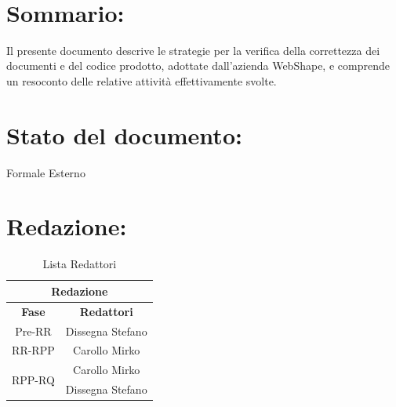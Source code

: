 \newpage
 
\begin{center} %
  \begin{Huge}  
        \textbf{\TITOLODOC}
      \\
  \end{Huge}
\end{center}
 
\section*{\LARGE Sommario:} %
\indent \indent
Il presente documento descrive le strategie per la verifica della correttezza dei documenti e del codice prodotto, adottate dall'azienda WebShape, e comprende un resoconto delle relative attivit\`a effettivamente svolte.
 
\section*{\LARGE Stato del documento:}
\indent \indent
  Formale Esterno
 
\section*{\LARGE Redazione:}
  \begin{table}[!h]
    \begin{center}
      \begin{tabular}
        {|c|c|}
        \hline
        \multicolumn{2}{|c|}{ \textbf{Redazione} } \\
        \hline
        \textbf{Fase} & \textbf{Redattori} \\
        \hline
        Pre-RR & Dissegna Stefano\\
        \hline
        RR-RPP & Carollo Mirko\\
        
        \hline
        \multirow{2}{*}{RPP-RQ} & Carollo Mirko \\
							& Dissegna Stefano \\
        
        \hline
      \end{tabular}
      \caption{Lista Redattori} %
      \label{tabredazione}
    \end{center}
  \end{table}  
 
